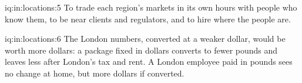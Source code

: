 \begin{solution}{iq:in:locations:5}
To trade each region's markets in its own hours with people who know them, to be near clients and regulators, and to
hire where the people are.
\end{solution}

\begin{solution}{iq:in:locations:6}
The London numbers, converted at a weaker dollar, would be worth more dollars: a package fixed in dollars converts to
fewer pounds and leaves less after London's tax and rent. A London employee paid in pounds sees no change at home, but
more dollars if converted.
\end{solution}
